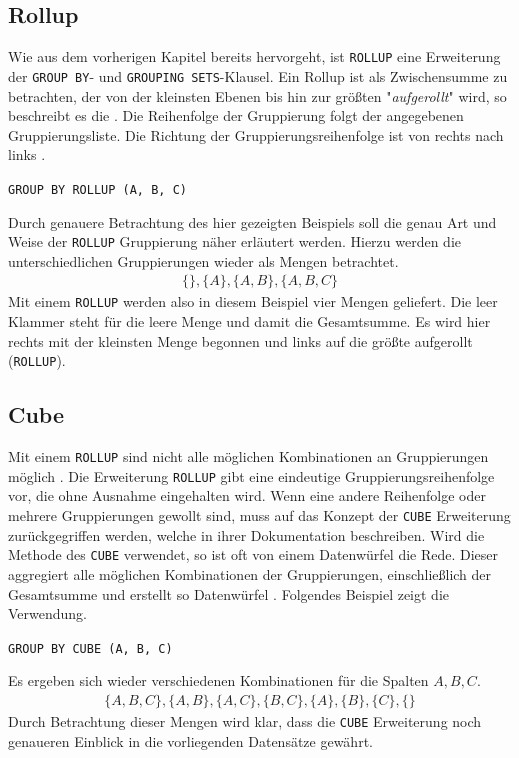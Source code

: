 \subsection{Rollup}
\label{subsec:rollup} Wie aus dem vorherigen Kapitel bereits hervorgeht, ist \texttt{ROLLUP}
eine Erweiterung der \texttt{GROUP BY}- und \texttt{GROUPING SETS}-Klausel. Ein
Rollup ist als Zwischensumme zu betrachten, der von der kleinsten Ebenen bis hin
zur größten "\textit{aufgerollt}" wird, so beschreibt es die \citet[K. 20]{oracle99}.
Die Reihenfolge der Gruppierung folgt der angegebenen Gruppierungsliste. Die
Richtung der Gruppierungsreihenfolge ist von rechts nach links \citep[vgl.][]{oracle16}.
\begin{center}
	\texttt{GROUP BY ROLLUP (A, B, C)}
\end{center}
Durch genauere Betrachtung des hier gezeigten Beispiels soll die genau Art und
Weise der \texttt{ROLLUP} Gruppierung näher erläutert werden. Hierzu werden die
unterschiedlichen Gruppierungen wieder als Mengen betrachtet.
\begin{align*}
	\{ \}, \{A\}, \{A, B\}, \{A, B, C\}
\end{align*}
Mit einem \texttt{ROLLUP} werden also in diesem Beispiel vier Mengen geliefert. Die
leer Klammer steht für die leere Menge und damit die Gesamtsumme. Es wird hier
rechts mit der kleinsten Menge begonnen und links auf die größte aufgerollt (\texttt{ROLLUP}).

\subsection{Cube}
\label{subsec:cube} Mit einem \texttt{ROLLUP} sind nicht alle möglichen
Kombinationen an Gruppierungen möglich \citep[vgl.][K. 20]{oracle99}. Die
Erweiterung \texttt{ROLLUP} gibt eine eindeutige Gruppierungsreihenfolge vor,
die ohne Ausnahme eingehalten wird. Wenn eine andere Reihenfolge oder mehrere Gruppierungen
gewollt sind, muss auf das Konzept der \texttt{CUBE} Erweiterung zurückgegriffen
werden, welche \citet[K. 20]{oracle99} in ihrer Dokumentation beschreiben. Wird
die Methode des \texttt{CUBE} verwendet, so ist oft von einem Datenwürfel die
Rede. Dieser aggregiert alle möglichen Kombinationen der Gruppierungen,
einschließlich der Gesamtsumme und erstellt so Datenwürfel \citep[vgl.][K. 20]{oracle99}.
Folgendes Beispiel zeigt die Verwendung.
\begin{center}
	\texttt{GROUP BY CUBE (A, B, C)}
\end{center}
Es ergeben sich wieder verschiedenen Kombinationen für die Spalten $A, B, C$.
\begin{align*}
	\{ A, B, C\}, \{A, B\}, \{A, C\}, \{B, C\}, \{A\}, \{B\}, \{C\}, \{ \}
\end{align*}
Durch Betrachtung dieser Mengen wird klar, dass die \texttt{CUBE} Erweiterung
noch genaueren Einblick in die vorliegenden Datensätze gewährt.
